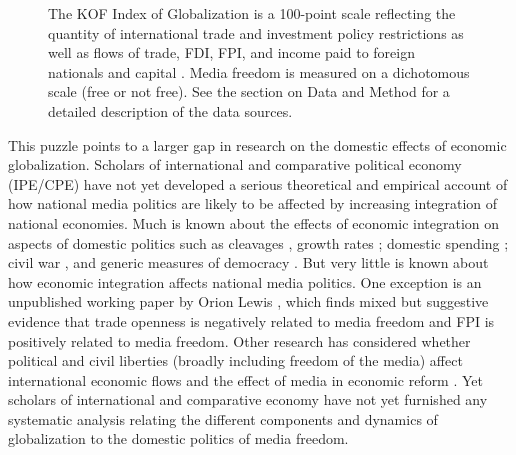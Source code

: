 \documentclass[12pt,a4paper]{article}\usepackage[]{graphicx}\usepackage[]{color}
\newenvironment{knitrout}{}{} %
\begin{document}
{\begin{figure}[t]
\begin{center}
\begin{knitrout}
\end{knitrout}
    \end{center}
    \begin{singlespace}
        {\scriptsize{The KOF Index of Globalization is a 100-point scale reflecting the quantity of international trade and investment policy restrictions as well as flows of trade, FDI, FPI, and income paid to foreign nationals and capital \parencite[43]{Dreher:2008dg}. Media freedom is measured on a dichotomous scale (free or not free). See the section on Data and Method for a detailed description of the data sources. 
                      }}
    \end{singlespace}
\end{figure}
\clearpage
}

This puzzle points to a larger gap in research on the domestic effects of economic globalization. Scholars of international and comparative political economy (IPE/CPE) have not yet developed a serious theoretical and empirical account of how national media politics are likely to be affected by increasing integration of national economies. Much is known about the effects of economic integration on aspects of domestic politics such as cleavages \parencites{Rogowski:1987ip}{Rogowski:1989wm}{Hiscox:2002us}{hiscox2002international}, growth rates \parencite{Rodriguez:2001uw}; domestic spending \parencites{Rodrik:1998te}{Burgoon:2001dp}; civil war \parencites{Barbieri:2005uk}{Bussmann:2007vx}, and generic measures of democracy \parencites{EICHENGREEN:2008gg}{Li:2003vj}. But very little is known about how economic integration affects national media politics. One exception is an unpublished working paper by Orion Lewis \parencite*{Lewis:qDvYbWlU}, which finds mixed but suggestive evidence that trade openness is negatively related to media freedom and FPI is positively related to media freedom. Other research has considered whether political and civil liberties (broadly including freedom of the media) affect international economic flows \parencite{Adam:2007gn} and the effect of media in economic reform \parencites{Coyne:2004bq}{Islam:2002uc}. Yet scholars of international and comparative economy have not yet furnished any systematic analysis relating the different components and dynamics of globalization to the domestic politics of media freedom.
\end{document}
